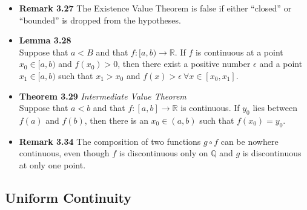 \documentclass[11pt,a4paper]{article}
\begin{document}
\begin{itemize}
    \item \textbf{Remark 3.27}
        The Existence Value Theorem is false if either ``closed'' or ``bounded'' is dropped
        from the hypotheses.

    \item \textbf{Lemma 3.28} \\
        Suppose that $a < B$ and that $f : [a, b) \to \mathbb{R}$.
        If $f$ is continuous at a point $x_0 \in [a,b)$ and $f(x_0) > 0$,
        then there exist a positive number $\epsilon$ and a point
        $x_1 \in [a, b)$ such that $x_1 > x_0$ and $f(x) > \epsilon \ \forall
        x \in [x_0, x_1]$.

    \item \textbf{Theorem 3.29} \emph{Intermediate Value Theorem} \\
        Suppose that $a < b$ and that $f : [a, b] \to \mathbb{R}$ is continuous.
        If $y_0$ lies between $f(a)$ and $f(b)$, then there is an $x_0 \in (a, b)$
        such that $f(x_0) = y_0$.

    \item \textbf{Remark 3.34}
        The composition of two functions $g \circ f$ can be nowhere continuous,
        even though $f$ is discontinuous only on $\mathbb{Q}$ and $g$ is discontinuous
        at only one point.

\end{itemize}

\subsection{Uniform Continuity}
\end{document}
